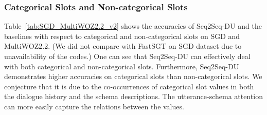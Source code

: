 \documentclass[11pt]{article}
\begin{document}
\begin{table}[!h]
\centering
{}
\caption{Accuracy of Seq2Seq-DU in each domain on SGD test set. Domains marked with ‘*’ are those for which the schemas in the test set are not present in the training set. Domains marked with ‘**’ have both the unseen and seen schemas. For other domains, the schemas in the test set are also seen in the training set.}  
\label{tab:domain_performance_sgd}
\end{table}




\subsubsection*{Categorical Slots and Non-categorical Slots}

Table~\ref{tab:SGD_MultiWOZ2.2_v2} shows the accuracies of Seq2Seq-DU and the baselines with respect to categorical and non-categorical slots on SGD and MultiWOZ2.2. (We did not compare with FastSGT on SGD dataset due to unavailability of the codes.) One can see that Seq2Seq-DU can effectively deal with both categorical and non-categorical slots. Furthermore, Seq2Seq-DU demonstrates higher accuracies on categorical slots than non-categorical slots. We conjecture that it is due to the co-occurrences of categorical slot values in both the dialogue history and the schema descriptions. The utterance-schema attention can more easily capture the relations between the values.
\end{document}
